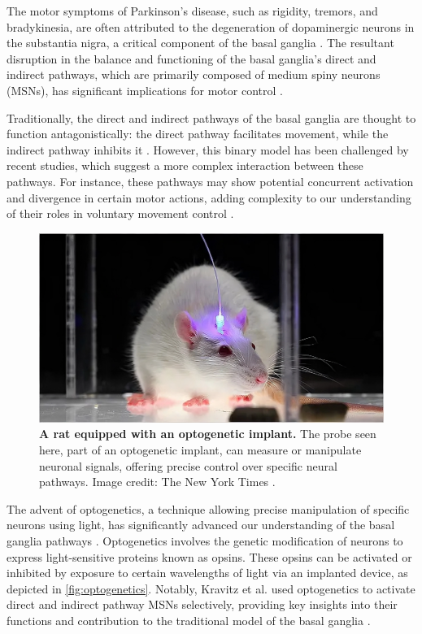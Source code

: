 \documentclass[10pt]{article}
\begin{document}
\begin{sloppypar}
  The motor symptoms of Parkinson’s disease, such as rigidity, tremors, and bradykinesia, are often attributed to the degeneration of dopaminergic neurons in the substantia nigra, a critical component of the basal ganglia \citep{abedini_cooccurrence_2015}. The resultant disruption in the balance and functioning of the basal ganglia’s direct and indirect pathways, which are primarily composed of medium spiny neurons (MSNs), has significant implications for motor control \cite{abedini_cooccurrence_2015,ojagbemi_neuropsychiatric_2013}.

  Traditionally, the direct and indirect pathways of the basal ganglia are thought to function antagonistically: the direct pathway facilitates movement, while the indirect pathway inhibits it \citep{isett_indirect_2022}. However, this binary model has been challenged by recent studies, which suggest a more complex interaction between these pathways. For instance, these pathways may show potential concurrent activation and divergence in certain motor actions, adding complexity to our understanding of their roles in voluntary movement control \citep{perez_striatal_2017}.

  \begin{figure}[ht]
    \centering
    \includegraphics[width=\textwidth]{figures/optogenetics.png}
    \caption[A rat equipped with an optogenetic implant]{\textbf{A rat equipped with an optogenetic implant.} The probe seen here, part of an optogenetic implant, can measure or manipulate neuronal signals, offering precise control over specific neural pathways. Image credit: The New York Times \citep{belluck_risky_2016}.}
    \label{fig:optogenetics}
  \end{figure}

  The advent of optogenetics, a technique allowing precise manipulation of specific neurons using light, has significantly advanced our understanding of the basal ganglia pathways \citep{deisseroth_next-generation_2006}. Optogenetics involves the genetic modification of neurons to express light-sensitive proteins known as opsins. These opsins can be activated or inhibited by exposure to certain wavelengths of light via an implanted device, as depicted in \autoref{fig:optogenetics}. Notably, Kravitz et al. used optogenetics to activate direct and indirect pathway MSNs selectively, providing key insights into their functions and contribution to the traditional model of the basal ganglia \citep{kravitz_regulation_2010}.


\end{sloppypar}
\end{document}
